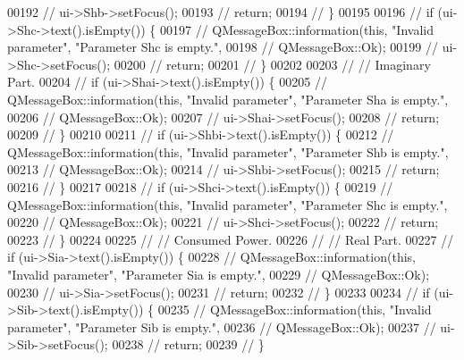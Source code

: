 \begin{DoxyCode}
00192 \textcolor{comment}{//    ui->Shb->setFocus();}
00193 \textcolor{comment}{//    return;}
00194 \textcolor{comment}{//  \}}
00195 
00196 \textcolor{comment}{//  if (ui->Shc->text().isEmpty()) \{}
00197 \textcolor{comment}{//    QMessageBox::information(this, "Invalid parameter", "Parameter Shc is empty.",}
00198 \textcolor{comment}{//                             QMessageBox::Ok);}
00199 \textcolor{comment}{//    ui->Shc->setFocus();}
00200 \textcolor{comment}{//    return;}
00201 \textcolor{comment}{//  \}}
00202 
00203 \textcolor{comment}{//  // Imaginary Part.}
00204 \textcolor{comment}{//  if (ui->Shai->text().isEmpty()) \{}
00205 \textcolor{comment}{//    QMessageBox::information(this, "Invalid parameter", "Parameter Sha is empty.",}
00206 \textcolor{comment}{//                             QMessageBox::Ok);}
00207 \textcolor{comment}{//    ui->Shai->setFocus();}
00208 \textcolor{comment}{//    return;}
00209 \textcolor{comment}{//  \}}
00210 
00211 \textcolor{comment}{//  if (ui->Shbi->text().isEmpty()) \{}
00212 \textcolor{comment}{//    QMessageBox::information(this, "Invalid parameter", "Parameter Shb is empty.",}
00213 \textcolor{comment}{//                             QMessageBox::Ok);}
00214 \textcolor{comment}{//    ui->Shbi->setFocus();}
00215 \textcolor{comment}{//    return;}
00216 \textcolor{comment}{//  \}}
00217 
00218 \textcolor{comment}{//  if (ui->Shci->text().isEmpty()) \{}
00219 \textcolor{comment}{//    QMessageBox::information(this, "Invalid parameter", "Parameter Shc is empty.",}
00220 \textcolor{comment}{//                             QMessageBox::Ok);}
00221 \textcolor{comment}{//    ui->Shci->setFocus();}
00222 \textcolor{comment}{//    return;}
00223 \textcolor{comment}{//  \}}
00224 
00225 \textcolor{comment}{//  // Consumed Power.}
00226 \textcolor{comment}{//  // Real Part.}
00227 \textcolor{comment}{//  if (ui->Sia->text().isEmpty()) \{}
00228 \textcolor{comment}{//    QMessageBox::information(this, "Invalid parameter", "Parameter Sia is empty.",}
00229 \textcolor{comment}{//                             QMessageBox::Ok);}
00230 \textcolor{comment}{//    ui->Sia->setFocus();}
00231 \textcolor{comment}{//    return;}
00232 \textcolor{comment}{//  \}}
00233 
00234 \textcolor{comment}{//  if (ui->Sib->text().isEmpty()) \{}
00235 \textcolor{comment}{//    QMessageBox::information(this, "Invalid parameter", "Parameter Sib is empty.",}
00236 \textcolor{comment}{//                             QMessageBox::Ok);}
00237 \textcolor{comment}{//    ui->Sib->setFocus();}
00238 \textcolor{comment}{//    return;}
00239 \textcolor{comment}{//  \}}

\end{DoxyCode}
